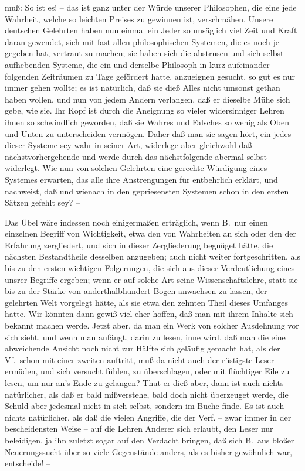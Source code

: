muß: So ist es! -- das ist ganz unter der Würde unserer Philosophen, die eine jede Wahrheit, welche so leichten Preises zu gewinnen ist, verschmähen. Unsere deutschen Gelehrten haben nun einmal ein Jeder so unsäglich viel Zeit und Kraft daran gewendet, sich mit fast allen philosophischen Systemen, die es noch je gegeben hat, vertraut zu machen; sie haben sich die abstrusen und sich selbst aufhebenden Systeme, die ein und derselbe Philosoph in kurz aufeinander folgenden Zeiträumen zu Tage gefördert hatte, anzueignen gesucht, so gut es nur immer gehen wollte; es ist natürlich, daß sie dieß Alles nicht umsonst gethan haben wollen, und nun von jedem Andern verlangen, daß er dieselbe Mühe sich gebe, wie sie. Ihr Kopf ist durch die Aneignung so vieler widersinniger Lehren ihnen so schwindlich geworden, daß sie Wahres und Falsches so wenig als Oben und Unten zu unterscheiden vermögen. Daher daß man sie sagen hört, ein jedes dieser Systeme sey wahr in seiner Art, widerlege aber gleichwohl daß nächstvorhergehende und werde durch das nächstfolgende abermal selbst widerlegt. Wie nun von solchen Gelehrten eine gerechte Würdigung eines Systemes erwarten, das alle ihre Anstrengungen für entbehrlich erklärt, und nachweist, daß und wienach in den gepriesensten Systemen schon in den ersten Sätzen gefehlt sey? --\par
Das Übel wäre indessen noch einigermaßen erträglich, wenn B.\ nur einen einzelnen Begriff von Wichtigkeit, etwa den von Wahrheiten an sich oder den der Erfahrung zergliedert, und sich in dieser Zergliederung begnüget hätte, die nächsten Bestandtheile desselben anzugeben; auch nicht weiter fortgeschritten, als bis zu den ersten wichtigen Folgerungen, die sich aus dieser Verdeutlichung eines unsrer Begriffe ergeben; wenn er auf solche Art seine Wissenschaftslehre, statt sie bis zu der Stärke von anderthalbhundert Bogen anwachsen zu lassen, der gelehrten Welt vorgelegt hätte, als sie etwa den zehnten Theil dieses Umfanges hatte. Wir könnten dann gewiß viel eher hoffen, daß man mit ihrem Inhalte sich bekannt machen werde. Jetzt aber, da man ein Werk von solcher Ausdehnung vor sich sieht, und wenn man anfängt,  darin zu lesen, inne wird, daß man die eine abweichende Ansicht noch nicht zur Hälfte sich geläufig gemacht hat, als der Vf.\ schon mit einer zweiten auftritt, muß da nicht auch der rüstigste Leser ermüden, und sich versucht fühlen, zu überschlagen, oder mit flüchtiger Eile zu lesen, um nur an's Ende zu gelangen? Thut er dieß aber, dann ist auch nichts natürlicher, als daß er bald mißverstehe, bald doch nicht überzeuget werde, die Schuld aber jedesmal nicht in sich selbst, sondern im Buche finde. Es ist auch nichts natürlicher, als daß die vielen Angriffe, die der Verf. -- zwar immer in der bescheidensten Weise -- auf die Lehren Anderer sich erlaubt, den Leser nur beleidigen, ja ihn zuletzt sogar auf den Verdacht bringen, daß sich B.\ aus bloßer Neuerungssucht über so viele Gegenstände anders, als es bisher gewöhnlich war, entscheide! -- \par 
